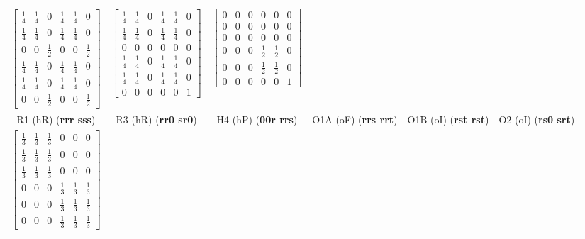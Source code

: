\documentclass[preprint]{iucr}              %
\newcommand{\charseq}[1]{({\bf #1})}
\begin{document}
\begin{table}
\begin{tabular}{cccccc}
			$\begin{bmatrix} \tfrac{1}{4} & \tfrac{1}{4} & 0 & \tfrac{1}{4} & \tfrac{1}{4} & 0 \\ \tfrac{1}{4} & \tfrac{1}{4} & 0 & \tfrac{1}{4} & \tfrac{1}{4} & 0 \\ 0 & 0 & \tfrac{1}{2} & 0 & 0 & \tfrac{1}{2} \\ \tfrac{1}{4} & \tfrac{1}{4} & 0 & \tfrac{1}{4} & \tfrac{1}{4} & 0 \\ \tfrac{1}{4} & \tfrac{1}{4} & 0 & \tfrac{1}{4} & \tfrac{1}{4} & 0 \\ 0 & 0 & \tfrac{1}{2} & 0 & 0 & \tfrac{1}{2} \end{bmatrix}$ &
			$\begin{bmatrix} \tfrac{1}{4} & \tfrac{1}{4} & 0 & \tfrac{1}{4} & \tfrac{1}{4} & 0 \\ \tfrac{1}{4} & \tfrac{1}{4} & 0 & \tfrac{1}{4} & \tfrac{1}{4} & 0 \\ 0 & 0 & 0 & 0 & 0 & 0 \\ \tfrac{1}{4} & \tfrac{1}{4} & 0 & \tfrac{1}{4} & \tfrac{1}{4} & 0 \\ \tfrac{1}{4} & \tfrac{1}{4} & 0 & \tfrac{1}{4} & \tfrac{1}{4} & 0 \\ 0 & 0 & 0 & 0 & 0 & 1 \end{bmatrix}$ &
			$\begin{bmatrix} 0 & 0 & 0 & 0 & 0 & 0 \\ 0 & 0 & 0 & 0 & 0 & 0 \\ 0 & 0 & 0 & 0 & 0 & 0 \\ 0 & 0 & 0 & \tfrac{1}{2} & \tfrac{1}{2} & 0 \\ 0 & 0 & 0 & \tfrac{1}{2} & \tfrac{1}{2} & 0 \\ 0 & 0 & 0 & 0 & 0 & 1 \end{bmatrix}$ \\
			\midrule
			R1 (hR) \charseq{rrr sss} & R3 (hR) \charseq{rr0 sr0} & H4 (hP) \charseq{00r rrs} & O1A (oF) \charseq{rrs rrt} & O1B (oI) \charseq{rst rst} & O2 (oI) \charseq{rs0 srt} \\[2pt]
			$\begin{bmatrix} \tfrac{1}{3} & \tfrac{1}{3} & \tfrac{1}{3} & 0 & 0 & 0 \\ \tfrac{1}{3} & \tfrac{1}{3} & \tfrac{1}{3} & 0 & 0 & 0 \\ \tfrac{1}{3} & \tfrac{1}{3} & \tfrac{1}{3} & 0 & 0 & 0 \\ 0 & 0 & 0 & \tfrac{1}{3} & \tfrac{1}{3} & \tfrac{1}{3} \\ 0 & 0 & 0 & \tfrac{1}{3} & \tfrac{1}{3} & \tfrac{1}{3} \\ 0 & 0 & 0 & \tfrac{1}{3} & \tfrac{1}{3} & \tfrac{1}{3} \end{bmatrix}$ &

\end{tabular}
\end{table}
\end{document}
